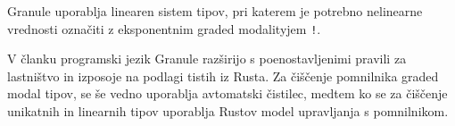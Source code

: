 Granule uporablja linearen sistem tipov, pri katerem je potrebno nelinearne vrednosti označiti z eksponentnim graded modalityjem \texttt{!}.


V članku \cite{10.1145/3649848} programski jezik Granule razširijo s poenostavljenimi pravili za lastništvo in izposoje na podlagi tistih iz Rusta. Za čiščenje pomnilnika graded modal tipov, se še vedno uporablja avtomatski čistilec, medtem ko se za čiščenje unikatnih in linearnih tipov uporablja Rustov model upravljanja s pomnilnikom.